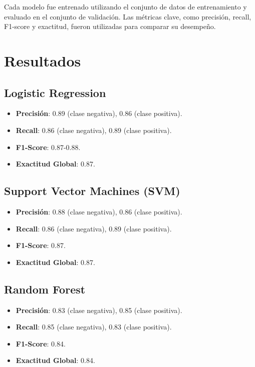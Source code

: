 \documentclass[conference]{IEEEtran}
\begin{document}
Cada modelo fue entrenado utilizando el conjunto de datos de entrenamiento y evaluado en el conjunto de validación. Las métricas clave, como precisión, recall, F1-score y exactitud, fueron utilizadas para comparar su desempeño.



\section{Resultados}

\subsection*{Logistic Regression}
\begin{itemize}
\item \textbf{Precisión}: 0.89 (clase negativa), 0.86 (clase positiva).
\item \textbf{Recall}: 0.86 (clase negativa), 0.89 (clase positiva).
\item \textbf{F1-Score}: 0.87-0.88.
\item \textbf{Exactitud Global}: 0.87.
\end{itemize}

\subsection*{Support Vector Machines (SVM)}
\begin{itemize}
\item \textbf{Precisión}: 0.88 (clase negativa), 0.86 (clase positiva).
\item \textbf{Recall}: 0.86 (clase negativa), 0.89 (clase positiva).
\item \textbf{F1-Score}: 0.87.
\item \textbf{Exactitud Global}: 0.87.
\end{itemize}

\subsection*{Random Forest}
\begin{itemize}
\item \textbf{Precisión}: 0.83 (clase negativa), 0.85 (clase positiva).
\item \textbf{Recall}: 0.85 (clase negativa), 0.83 (clase positiva).
\item \textbf{F1-Score}: 0.84.
\item \textbf{Exactitud Global}: 0.84.
\end{itemize}
\end{document}
